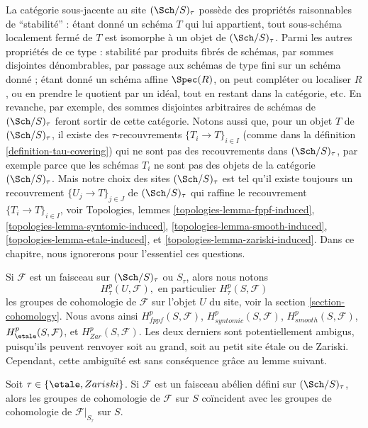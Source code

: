 \noindent
La cat\'egorie sous-jacente au site $(\Sch/S)_\tau$ poss\`ede des propri\'et\'es
raisonnables de ``stabilit\'e'' : \'etant donn\'e un sch\'ema $T$ qui lui appartient, tout sous-sch\'ema
localement ferm\'e de $T$ est isomorphe \`a un objet de $(\Sch/S)_\tau$.
Parmi les autres propri\'et\'es de ce type : stabilit\'e par produits fibr\'es de sch\'emas,
par sommes disjointes d\'enombrables,
par passage aux sch\'emas de type fini sur un sch\'ema donn\'e ; \'etant donn\'e un sch\'ema affine
$\Spec(R)$, on peut compl\'eter ou localiser $R$, ou en prendre le quotient
par un id\'eal, tout en restant dans la cat\'egorie, etc.
En revanche, par exemple, des sommes disjointes arbitraires
de sch\'emas de $(\Sch/S)_\tau$ feront sortir de cette cat\'egorie.
Notons aussi que, pour un objet $T$ de $(\Sch/S)_\tau$, il existe des
$\tau$-recouvrements $\{T_i \to T\}_{i \in I}$ (comme dans la
d\'efinition \ref{definition-tau-covering})
qui ne sont pas des recouvrements dans $(\Sch/S)_\tau$, par exemple
parce que les sch\'emas $T_i$ ne sont pas des objets de la cat\'egorie
$(\Sch/S)_\tau$. Mais notre choix des sites $(\Sch/S)_\tau$
est tel qu'il existe toujours
un recouvrement $\{U_j \to T\}_{j \in J}$ de $(\Sch/S)_\tau$ qui raffine
le recouvrement $\{T_i \to T\}_{i \in I}$, voir
Topologies, lemmes
\ref{topologies-lemma-fppf-induced},
\ref{topologies-lemma-syntomic-induced},
\ref{topologies-lemma-smooth-induced},
\ref{topologies-lemma-etale-induced}, et
\ref{topologies-lemma-zariski-induced}.
Dans ce chapitre, nous ignorerons pour l'essentiel ces questions.

\medskip\noindent
Si $\mathcal{F}$ est un faisceau sur $(\Sch/S)_\tau$ ou $S_\tau$, alors
nous notons
$$
H^p_\tau(U, \mathcal{F}), \text{ en particulier }
H^p_\tau(S, \mathcal{F})
$$
les groupes de cohomologie de $\mathcal{F}$ sur l'objet $U$ du site, voir
la section \ref{section-cohomology}. Nous avons ainsi
$H^p_{fppf}(S, \mathcal{F})$,
$H^p_{syntomic}(S, \mathcal{F})$,
$H^p_{smooth}(S, \mathcal{F})$,
$H^p_\etale(S, \mathcal{F})$, et
$H^p_{Zar}(S, \mathcal{F})$. Les deux derniers sont potentiellement ambigus, puisqu'ils
peuvent renvoyer soit au grand, soit au petit site \'etale ou de Zariski. Cependant,
cette ambigu\"it\'e est sans cons\'equence gr\^ace au lemme suivant.

\begin{lemma}
\label{lemma-compare-cohomology-big-small}
Soit $\tau \in \{\etale, Zariski\}$.
Si $\mathcal{F}$ est un faisceau ab\'elien d\'efini sur
$(\Sch/S)_\tau$, alors
les groupes de cohomologie de $\mathcal{F}$ sur $S$ co\"incident avec les groupes de cohomologie
de $\mathcal{F}|_{S_\tau}$ sur $S$.
\end{lemma}

